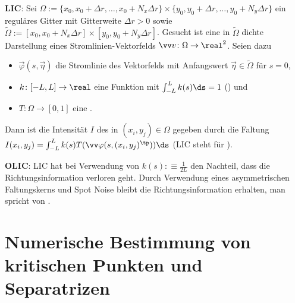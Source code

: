 \linie

\textbf{LIC}:
Sei $\Omega := \{x_0, x_0 + \Delta r, \dotsc, x_0 + N_x \Delta r\} \times
\{y_0, y_0 + \Delta r, \dotsc, y_0 + N_y \Delta r\}$
ein reguläres Gitter mit Gitterweite $\Delta r > 0$ sowie
$\widetilde{\Omega} := [x_0, x_0 + N_x \Delta r] \times [y_0, y_0 + N_y \Delta r]$.
Gesucht ist eine in $\widetilde{\Omega}$ dichte Darstellung eines Stromlinien-Vektorfelds
$\vec{v}\colon \Omega \to \real^2$.
Seien dazu
\begin{itemize}
    \item
    $\vec{\varphi}(s, \vec{\eta})$ die Stromlinie des Vektorfelds
    mit Anfangswert $\vec{\eta} \in \widetilde{\Omega}$ für $s = 0$,

    \item
    $k\colon [-L, L] \to \real$ eine Funktion mit $\int_{-L}^L k(s) \ds = 1$
    () und

    \item
    $T\colon \Omega \to [0, 1]$ eine .
\end{itemize}
Dann ist die Intensität $I$ des  in $(x_i, y_j) \in \Omega$ gegeben durch die
Faltung\\
$I(x_i, y_j) = \int_{-L}^L k(s) T(\vec{\varphi}(s, (x_i, y_j)^\tp)) \ds$
(LIC steht für ).

\textbf{OLIC}:
LIC hat bei Verwendung von $k(s) :\equiv \frac{1}{2L}$ den Nachteil, dass die Richtungsinformation
verloren geht.
Durch Verwendung eines asymmetrischen Faltungskerns und Spot Noise bleibt die Richtungsinformation
erhalten, man spricht von .

\pagebreak

\section{%
    Numerische Bestimmung von kritischen Punkten und Separatrizen%
}

